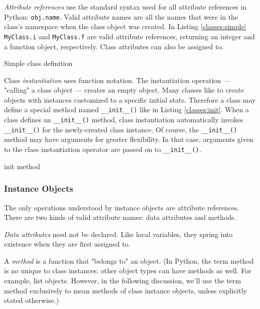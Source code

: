 \emph{Attribute references} use the standard syntax
used for all attribute references in Python: \verb=obj.name=.
Valid attribute names are all the names that were in the class's namespace
when the class object was created.
In Listing \ref{classes:simple} \verb=MyClass.i= and \verb=MyClass.f=
are valid attribute references, returning an integer and a function object,
respectively.
Class attributes can also be assigned to.

\begin{program}
\caption{Simple class definition\label{classes:simple}}
\end{program}

Class \emph{instantiation} uses function notation.
The instantiation operation --- "calling" a class object ---
creates an empty object.
Many classes like to create objects
with instances customized to a specific initial state.
Therefore a class may define a special method named \verb=__init__()=
like in Listing \ref{classes:init}.
When a class defines an \verb=__init__()= method,
class instantiation automatically invokes \verb=__init__()=
for the newly-created class instance.
Of course, the \verb=__init__()= method may have arguments
for greater flexibility.
In that case, arguments given to the class instantiation operator
are passed on to \verb=__init__()=.

\begin{program}
\caption{init method\label{classes:init}}
\end{program}


\subsubsection{Instance Objects}

The only operations understood by instance objects are attribute references.
There are two kinds of valid attribute names: data attributes and methods.

\emph{Data attributes} need not be declared.
Like local variables,
they spring into existence when they are first assigned to.

A \emph{method} is a function that "belongs to" an object.
(In Python, the term method is no unique to class instances:
other object types can have methods as well.
For example, list objects.
However, in the following discussion, we'll use the term method
exclusively to mean methods of class instance objects,
unless explicitly stated otherwise.)

